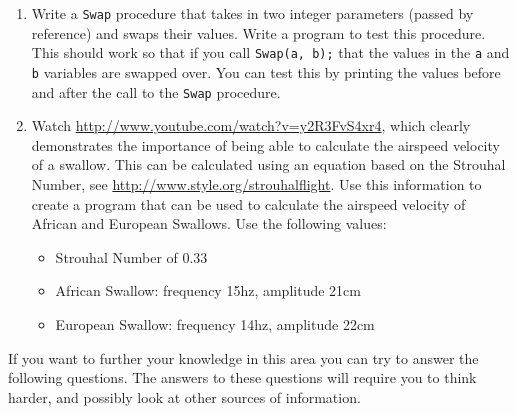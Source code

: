 \begin{enumerate}
  \item Write a \texttt{Swap} procedure that takes in two integer parameters (passed by reference) and swaps their values. Write a program to test this procedure. This should work so that if you call \texttt{Swap(a, b);} that the values in the \texttt{a} and \texttt{b} variables are swapped over. You can test this by printing the values before and after the call to the \texttt{Swap} procedure.
  \item Watch \url{http://www.youtube.com/watch?v=y2R3FvS4xr4}, which clearly demonstrates the importance of being able to calculate the airspeed velocity of a swallow. This can be calculated using an equation based on the Strouhal Number, see \url{http://www.style.org/strouhalflight}. Use this information to create a program that can be used to calculate the airspeed velocity of African and European Swallows. Use the following values:
  \begin{itemize}
    \item Strouhal Number of 0.33
    \item African Swallow: frequency 15hz, amplitude 21cm
    \item European Swallow: frequency 14hz, amplitude 22cm
  \end{itemize}
\end{enumerate}

\clearpage

If you want to further your knowledge in this area you can try to answer the following questions. The answers to these questions will require you to think harder, and possibly look at other sources of information.

